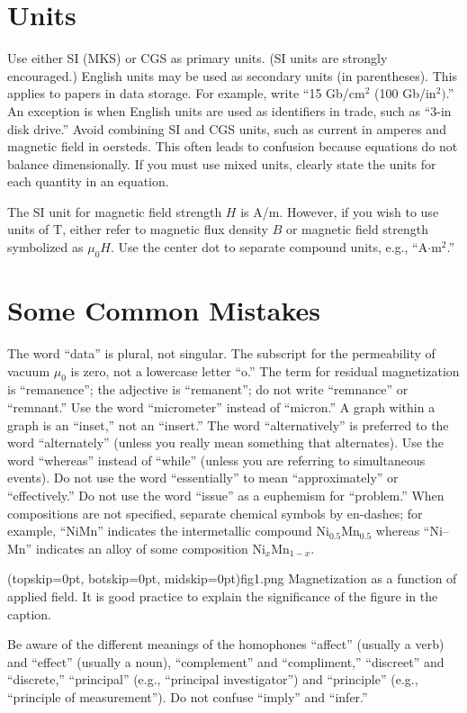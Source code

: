 \documentclass{ieeeaccess}
\begin{document}
\section{Units}
Use either SI (MKS) or CGS as primary units. (SI units are strongly
encouraged.) English units may be used as secondary units (in parentheses).
This applies to papers in data storage. For example, write ``15
Gb/cm$^{2}$ (100 Gb/in$^{2})$.'' An exception is when
English units are used as identifiers in trade, such as ``3\textonehalf-in
disk drive.'' Avoid combining SI and CGS units, such as current in amperes
and magnetic field in oersteds. This often leads to confusion because
equations do not balance dimensionally. If you must use mixed units, clearly
state the units for each quantity in an equation.

The SI unit for magnetic field strength $H$ is A/m. However, if you wish to use
units of T, either refer to magnetic flux density $B$ or magnetic field
strength symbolized as $\mu _{0}H$. Use the center dot to separate
compound units, e.g., ``A$\cdot $m$^{2}$.''

\section{Some Common Mistakes}
The word ``data'' is plural, not singular. The subscript for the
permeability of vacuum $\mu _{0}$ is zero, not a lowercase letter
``o.'' The term for residual magnetization is ``remanence''; the adjective
is ``remanent''; do not write ``remnance'' or ``remnant.'' Use the word
``micrometer'' instead of ``micron.'' A graph within a graph is an
``inset,'' not an ``insert.'' The word ``alternatively'' is preferred to the
word ``alternately'' (unless you really mean something that alternates). Use
the word ``whereas'' instead of ``while'' (unless you are referring to
simultaneous events). Do not use the word ``essentially'' to mean
``approximately'' or ``effectively.'' Do not use the word ``issue'' as a
euphemism for ``problem.'' When compositions are not specified, separate
chemical symbols by en-dashes; for example, ``NiMn'' indicates the
intermetallic compound Ni$_{0.5}$Mn$_{0.5}$ whereas
``Ni--Mn'' indicates an alloy of some composition
Ni$_{x}$Mn$_{1-x}$.

\Figure[t!](topskip=0pt, botskip=0pt, midskip=0pt){fig1.png}
{Magnetization as a function of applied field.
    It is good practice to explain the significance of the figure in the caption.\label{fig1}}

Be aware of the different meanings of the homophones ``affect'' (usually a
verb) and ``effect'' (usually a noun), ``complement'' and ``compliment,''
``discreet'' and ``discrete,'' ``principal'' (e.g., ``principal
investigator'') and ``principle'' (e.g., ``principle of measurement''). Do
not confuse ``imply'' and ``infer.''
\end{document}
